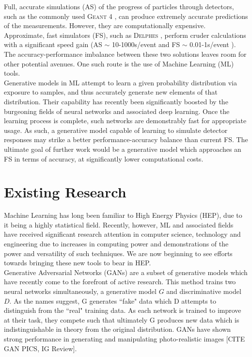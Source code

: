 \documentclass{report}
\newcommand{\pkg}[1]{\textsc{#1}}
\begin{document}
Full, accurate simulations (AS) of the progress of particles through detectors, such as the commonly used \pkg{Geant} 4 \cite{geant4}, can produce extremely accurate predictions of the measurements. However, they are computationally expensive. Approximate, fast simulators (FS), such as \pkg{Delphes} \cite{delphes}, perform cruder calculations with a significant speed gain (AS $\sim$ 10-1000s/event and FS $\sim$ 0.01-1s/event \cite{delphessl}). The accuracy-performance imbalance between these two solutions leaves room for other potential avenues. One such route is the use of Machine Learning (ML) tools.\\

Generative models in ML attempt to learn a given probability distribution via exposure to samples, and thus accurately generate new elements of that distribution. Their capability has recently been significantly boosted by the burgeoning fields of neural networks and associated deep learning. Once the learning process is complete, such networks are demonstrably fast for appropriate usage. As such, a generative model capable of learning to simulate detector responses may strike a better performance-accuracy balance than current FS. The ultimate goal of further work would be a generative model which approaches an FS in terms of accuracy, at significantly lower computational costs.\\

\section{Existing Research}

Machine Learning has long been familiar to High Energy Physics (HEP), due to it being a highly statistical field. Recently, however, ML and associated fields have received significant research attention in computer science, technology and engineering due to increases in computing power and demonstrations of the power and versatility of such techniques. We are now beginning to see efforts towards bringing these new tools to bear in HEP.\\

Generative Adversarial Networks (GANs) \cite{gan1} are a subset of generative models which have recently come to the forefront of active research. This method trains two neural networks simultaneously, a generative model $G$ and discriminative model $D$. As the names suggest, G generates ``fake" data which D attempts to distinguish from the ``real" training data. As each network is trained to improve at their task, they compete such that ultimately G produces new data which is indistinguishable in theory from the original distribution. GANs have shown strong performance in generating and manipulating photo-realistic images [CITE GAN PICS, IG Review].\\
\end{document}
